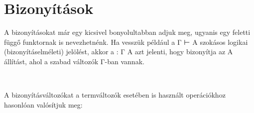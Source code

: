 \section{Bizonyítások}

A bizonyításokat már egy kicsivel bonyolultabban adjuk meg, ugyanis egy  feletti függő funktornak is nevezhetnénk. Ha vesszük például a Γ ⊢ A szokásos logikai (bizonyításelméleti) jelölést, akkor a  :  Γ A azt jelenti, hogy  bizonyítja az A állítást, ahol a szabad változók Γ-ban vannak.
\begin{code}%
%
\>[6]%
\>[10]\AgdaSymbol{:}\AgdaSpace{}%
\AgdaSymbol{(}\AgdaSpace{}%
\AgdaSymbol{:}\AgdaSpace{}%
\AgdaSymbol{)}\AgdaSpace{}%
\AgdaSpace{}%
\AgdaSpace{}%
\AgdaSpace{}%
\AgdaSpace{}%
\AgdaSpace{}%
\<%
\\
%
\>[6]\AgdaSpace{}%
\AgdaSymbol{:}\AgdaSpace{}%
\AgdaSpace{}%
\AgdaSpace{}%
\AgdaSymbol{\}}\AgdaSpace{}%
\AgdaSpace{}%
\AgdaSpace{}%
\AgdaSpace{}%
\AgdaSpace{}%
\AgdaSpace{}%
\AgdaSymbol{(}\AgdaSpace{}%
\AgdaSymbol{:}\AgdaSpace{}%
\AgdaSpace{}%
\AgdaSpace{}%
\AgdaSymbol{)}\AgdaSpace{}%
\AgdaSpace{}%
\AgdaSpace{}%
\AgdaSpace{}%
\AgdaSymbol{(}\AgdaSpace{}%
\AgdaOperator{\AgdaField{[}}\AgdaSpace{}%
\AgdaSpace{}%
\AgdaOperator{\AgdaField{]ᶠ}}\AgdaSymbol{)}\<%
\end{code}
A bizonyításváltozókat a termváltozók esetében is használt operációkhoz hasonlóan valósítjuk meg:
